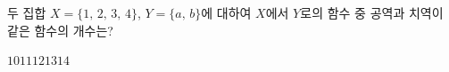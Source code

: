 두 집합 $X=\{1,\,2,\,3,\,4\}$, $Y=\{a,\,b\}$에 대하여 $X$에서 $Y$로의 함수 중 공역과 치역이 같은 함수의 개수는?
\begin{choices32}{$10$}{$11$}{$12$}{$13$}{$14$}\end{choices32}
